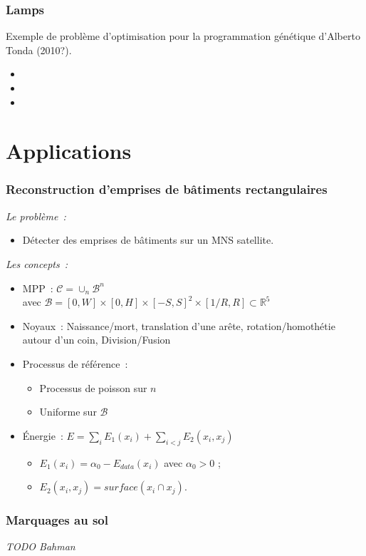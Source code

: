 \documentclass{beamer}
\begin{document}
\begin{frame}
\frametitle{Lamps}
Exemple de problème d'optimisation pour la programmation génétique d'Alberto Tonda (2010?).
\begin{itemize}
\item 
\item 
\item 
\end{itemize}
\end{frame}

\section{Applications}

\begin{frame}
\frametitle{Reconstruction d'emprises de bâtiments rectangulaires}
\emph{Le probl\`eme~:} 
\begin{itemize}
\item Détecter des emprises de bâtiments sur un MNS satellite.
\end{itemize}
\emph{Les concepts~:}
\begin{itemize}
\item MPP~:  $\mathcal{C} = \cup_{n}\mathcal{B}^n$\\
avec $\mathcal{B}=[0,W]\times[0,H]\times[-S,S]^2\times[1/R,R] \subset  \mathds{R}^{5}$
\item Noyaux~: Naissance/mort, translation d'une arête, rotation/homothétie autour d'un coin, Division/Fusion
\item Processus de référence~:
\begin{itemize}
\item Processus de poisson sur $n$
\item Uniforme sur $\mathcal{B}$
\end{itemize}
\item \'Energie~: $E = \sum_i E_1(x_i) + \sum_{i<j} E_2(x_i,x_j)$
\begin{itemize}
\item $E_1(x_i)=\alpha_{0} - E_{data}(x_i)$ avec $\alpha_{0}>0$ ;
\item $E_2(x_i,x_j) = surface(x_i \cap x_j)$.
\end{itemize}
\end{itemize}
\end{frame}

\begin{frame}
\frametitle{Marquages au sol}
\emph{TODO Bahman}
\end{frame}
\end{document}
